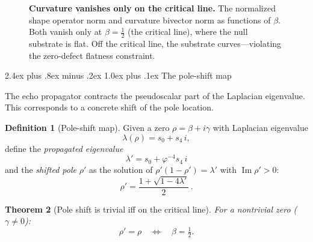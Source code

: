\documentclass[11pt,a4paper]{article}
\makeatletter
\theoremstyle{plain}
\newtheorem{theorem}{Theorem}[section]
\theoremstyle{definition}
\newtheorem{definition}[theorem]{Definition}
\theoremstyle{remark}
\numberwithin{equation}{section}
\newcommand{\vp}{\varphi}
\renewcommand{\subsection}{%
  \@startsection{subsection}{2}{0pt}%
    {2.4ex plus .8ex minus .2ex}%
    {1.0ex plus .1ex}%
    {\normalfont\Large\bfseries\color{headingAccent}}%
}
\makeatother
\begin{document}
\begin{figure}[ht]
\centering
{}
\caption{\textbf{Curvature vanishes only on the critical line.}
The normalized shape operator norm and curvature bivector norm
as functions of \(\beta\).  Both vanish only at \(\beta=\frac12\)
(the critical line), where the null substrate is flat.  Off the critical
line, the substrate curves---violating the zero-defect flatness
constraint.}
\label{fig:curvature-bivector}
\end{figure}

\subsection{The pole-shift map}
\label{subsec:pole-shift}

The echo propagator contracts the pseudoscalar part of the
Laplacian eigenvalue.  This corresponds to a concrete shift
of the pole location.

\begin{definition}[Pole-shift map]
\label{def:pole-shift}
Given a zero \(\rho=\beta+i\gamma\) with Laplacian eigenvalue
\[
  \lambda(\rho)=s_0+s_4\,i,
\]
define the \emph{propagated eigenvalue}
\[
  \lambda'=s_0+\vp^{-4}s_4\,i
\]
and the \emph{shifted pole} \(\rho'\) as the solution of
\(\rho'(1-\rho')=\lambda'\) with \(\operatorname{Im}\rho'>0\):
\[
  \rho'=\frac{1+\sqrt{1-4\lambda'}}{2}\,.
\]
\end{definition}

\begin{theorem}[Pole shift is trivial iff on the critical line]
\label{thm:pole-shift-trivial}
For a nontrivial zero (\(\gamma\ne0\)):
\[
  \rho'=\rho\quad\Longleftrightarrow\quad\beta=\tfrac12.
\]
\end{theorem}
\end{document}
